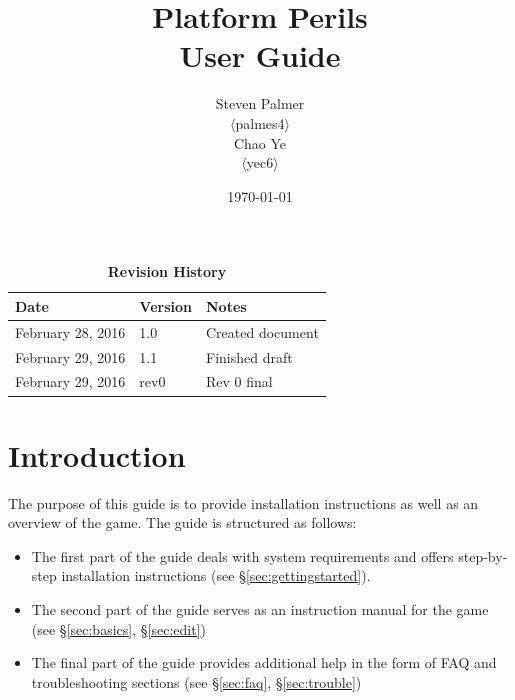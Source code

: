 \documentclass[12pt, titlepage]{article}
\begin{document}
\title{\bf Platform Perils\\[\baselineskip]\Large User Guide}
\author{Steven Palmer\\$\langle$palmes4$\rangle$\\Chao Ye\\$\langle$yec6$\rangle$}
\date{\today}
	
\maketitle

\tableofcontents
\listoftables
\listoffigures


\begin{table}[b]
\caption*{\bf Revision History}
\begin{tabularx}{\textwidth}{p{3.5cm}p{2cm}X}
\toprule {\bf Date} & {\bf Version} & {\bf Notes}\\
\midrule
February 28, 2016 & 1.0 & Created document\\
February 29, 2016 & 1.1 & Finished draft\\
February 29, 2016 & rev0 & Rev 0 final\\
\bottomrule
\end{tabularx}
\end{table}

\newpage


\section{Introduction}
The purpose of this guide is to provide installation instructions as well as an overview of the game.  The guide is structured as follows:

\begin{itemize}
  \item The first part of the guide deals with system requirements and offers step-by-step installation instructions (see \hyperref[sec:gettingstarted]{\S\ref*{sec:gettingstarted}}).
  \item The second part of the guide serves as an instruction manual for the game (see \hyperref[sec:basics]{\S\ref*{sec:basics}}, \hyperref[sec:edit]{\S\ref*{sec:edit}})
  \item The final part of the guide provides additional help in the form of FAQ and troubleshooting sections (see \hyperref[sec:faq]{\S\ref*{sec:faq}}, \hyperref[sec:trouble]{\S\ref*{sec:trouble}})
\end{itemize}
\end{document}
